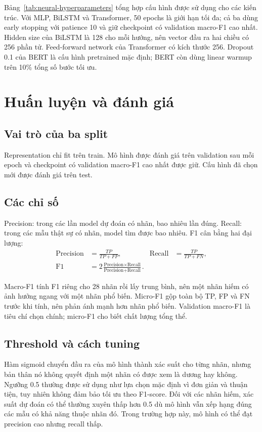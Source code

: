 \documentclass[12pt,a4paper]{article}
\begin{document}
Bảng~\ref{tab:neural-hyperparameters} tổng hợp cấu hình được sử dụng cho các kiến trúc. Với MLP, BiLSTM và Transformer, 50 epochs là giới hạn tối đa; cả ba dùng early stopping với patience 10 và giữ checkpoint có validation macro-F1 cao nhất. Hidden size của BiLSTM là 128 cho mỗi hướng, nên vector đầu ra hai chiều có 256 phần tử. Feed-forward network của Transformer có kích thước 256. Dropout 0.1 của BERT là cấu hình pretrained mặc định; BERT còn dùng linear warmup trên 10\% tổng số bước tối ưu.

\section{Huấn luyện và đánh giá}
\subsection{Vai trò của ba split}

Representation chỉ fit trên train. Mô hình được đánh giá trên validation sau mỗi epoch và checkpoint có validation macro-F1 cao nhất được giữ. Cấu hình đã chọn mới được đánh giá trên test.

\subsection{Các chỉ số}

Precision: trong các lần model dự đoán có nhãn, bao nhiêu lần đúng. Recall: trong các mẫu thật sự có nhãn, model tìm được bao nhiêu. F1 cân bằng hai đại lượng:
\begin{align}
\text{Precision}&=\frac{TP}{TP+FP},&
\text{Recall}&=\frac{TP}{TP+FN},\\
\text{F1}&=2\frac{\text{Precision}\times\text{Recall}}{\text{Precision}+\text{Recall}}.
\end{align}

Macro-F1 tính F1 riêng cho 28 nhãn rồi lấy trung bình, nên một nhãn hiếm có ảnh hưởng ngang với một nhãn phổ biến. Micro-F1 gộp toàn bộ TP, FP và FN trước khi tính, nên phản ánh mạnh hơn nhãn phổ biến. Validation macro-F1 là tiêu chí chọn chính; micro-F1 cho biết chất lượng tổng thể.

\subsection{Threshold và cách tuning}

Hàm sigmoid chuyển đầu ra của mô hình thành xác suất cho từng nhãn, nhưng bản thân nó không quyết định một nhãn có được xem là dương hay không. Ngưỡng 0.5 thường được sử dụng như lựa chọn mặc định vì đơn giản và thuận tiện, tuy nhiên không đảm bảo tối ưu theo F1-score. Đối với các nhãn hiếm, xác suất dự đoán có thể thường xuyên thấp hơn 0.5 dù mô hình vẫn xếp hạng đúng các mẫu có khả năng thuộc nhãn đó. Trong trường hợp này, mô hình có thể đạt precision cao nhưng recall thấp.
\end{document}
